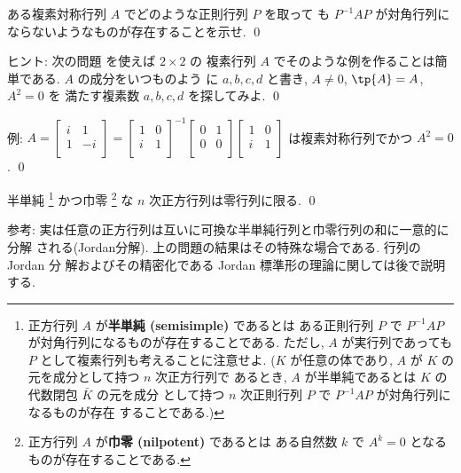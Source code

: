 \documentclass[12pt,twoside]{jarticle}
\newcommand\commentout[1]{#1}
\newcommand\commentout[1]{}
\begin{document}
\begin{question}
\label{q:non-semisimple}
  ある複素対称行列 $A$ でどのような正則行列 $P$ を取って
  も $P^{-1}AP$ が対角行列にならないようなものが存在することを示せ. \qed
\end{question}

\noindent
ヒント: 次の問題  を使えば $2\times 2$ の
複素行列 $A$ でそのような例を作ることは簡単である.  $A$ の成分をいつものよう
に $a,b,c,d$ と書き, $A\ne 0$, $\tp{A}=A$, $A^2=0$ を
満たす複素数 $a,b,c,d$ を探してみよ.
\qed

\commentout{
\medskip
\noindent
例: $A=
\begin{bmatrix}
  i & 1 \\
  1 & -i \\
\end{bmatrix}=
\begin{bmatrix}
  1 & 0 \\
  i & 1 \\
\end{bmatrix}^{-1}
\begin{bmatrix}
  0 & 1 \\
  0 & 0 \\
\end{bmatrix}
\begin{bmatrix}
  1 & 0 \\
  i & 1 \\
\end{bmatrix}$ は複素対称行列でかつ $A^2=0$.
\qed
}


\begin{question}
\label{q:ss-cap-nip=0}
  半単純%
  \footnote{正方行列 $A$ が{\bf 半単純 (semisimple)} であるとは
    ある正則行列 $P$ で $P^{-1}AP$ が対角行列になるものが存在することである.
    ただし, $A$ が実行列であっても $P$ として複素行列も考えることに注意せよ.
    ($K$ が任意の体であり, $A$ が $K$ の元を成分として持つ $n$ 次正方行列で
    あるとき, $A$ が半単純であるとは $K$ の代数閉包 $\bar{K}$ の元を成分
    として持つ $n$ 次正則行列 $P$ で $P^{-1}AP$ が対角行列になるものが存在
    することである.) 
    }%
  かつ巾零%
  \footnote{正方行列 $A$ が{\bf 巾零 (nilpotent)} であるとは
    ある自然数 $k$ で $A^k=0$ となるものが存在することである.}%
  な $n$ 次正方行列は零行列に限る.  \qed
\end{question}

\noindent
参考: 実は任意の正方行列は互いに可換な半単純行列と巾零行列の和に一意的に分解
される(Jordan分解).  上の問題の結果はその特殊な場合である.  行列の Jordan 分
解およびその精密化である Jordan 標準形の理論に関しては後で説明する.
\end{document}
